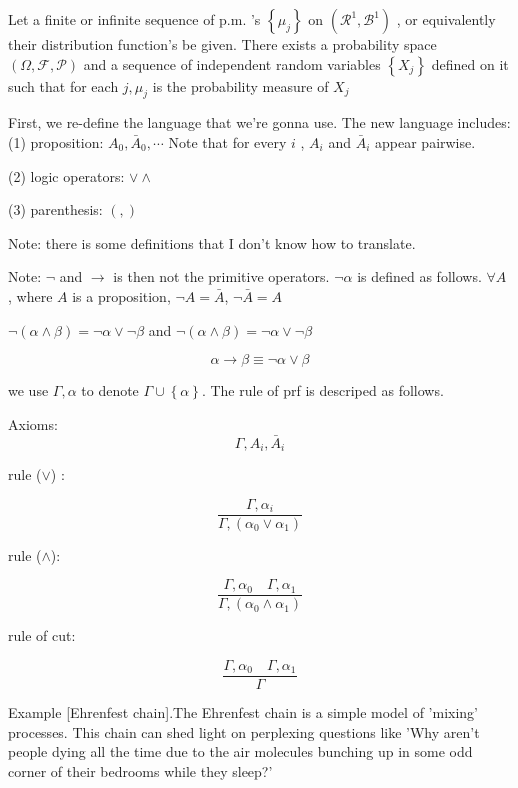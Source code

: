 \documentclass[a4paper, 10pt]{ctexart} %
\begin{document}
 Let a finite or infinite sequence of p.m. 's $\left\{\mu_{j}\right\}$ on $\left(\mathscr R ^{1} , \mathscr B ^{1}\right)$ , or equivalently their distribution function's be given. There exists a probability space $\left(\Omega , \mathscr F, \mathscr P\right)$ and a sequence of independent random variables $\left\{X_{j}\right\}$ defined on it such that for each $j, \mu_{j}$ is the probability measure of $X_{j}$

 First, we re-define the language that we're gonna use. The new language includes:
 (1) proposition: $A_{0 }, \bar A_{0} , \cdots $ Note that for every $i$ , $A_{i}$ and $\bar A_{i}$ appear pairwise. 

 (2) logic operators: $\lor \wedge $ 

 (3) parenthesis: $( , )$

 Note: there is some definitions that I don't know how to translate. 

 Note: $\neg $ and $\to $ is then not the primitive operators. $\neg \alpha$ is defined as follows. $\forall  A  $ , where $A$ is a proposition, $\neg A =  \bar A$, $\neg \bar A = A$ 

 $\neg \left(\alpha \wedge \beta\right) =  \neg \alpha \lor \neg \beta $ and $\neg\left(\alpha \wedge \beta\right) = \neg \alpha \lor \neg \beta $ 

 $$\alpha \to  \beta \equiv \neg \alpha \lor \beta$$


 we use $\varGamma , \alpha $ to denote $\varGamma \cup \left\{\alpha\right\}$. The rule of prf is descriped as follows. 

 Axioms: 
 $$\varGamma , A_{i} , \bar A_{i}$$

 rule ($\lor $) :

 $$\frac{\varGamma , \alpha_{i}}{\varGamma , \left(\alpha_{0} \lor  \alpha_{1}\right)}$$

 rule ($\wedge $): 

 $$\frac{\varGamma , \alpha _{0} \quad \varGamma , \alpha_{1}}{\varGamma , \left(\alpha_{0} \wedge \alpha_{1}\right)}$$

 rule of cut: 

 $$\frac{\varGamma, \alpha_0 \quad \varGamma , \alpha_1}{\varGamma}$$

 Example [Ehrenfest chain].The Ehrenfest chain is a simple model of 'mixing' processes. This chain can shed light on perplexing questions like 'Why aren't people dying all the time due to the air molecules bunching up in some odd corner of their bedrooms while they sleep?' 
\end{document}
